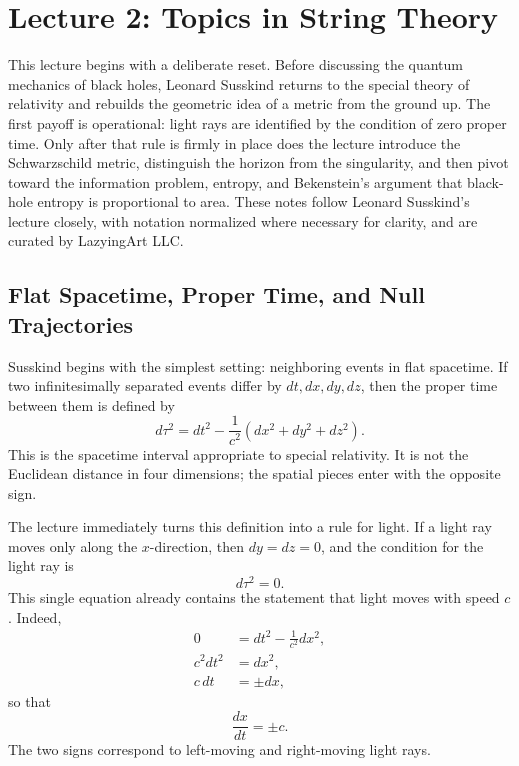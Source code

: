 \chapter{Lecture 2: Topics in String Theory}

This lecture begins with a deliberate reset. Before discussing the quantum mechanics of black holes, Leonard Susskind returns to the special theory of relativity and rebuilds the geometric idea of a metric from the ground up. The first payoff is operational: light rays are identified by the condition of zero proper time. Only after that rule is firmly in place does the lecture introduce the Schwarzschild metric, distinguish the horizon from the singularity, and then pivot toward the information problem, entropy, and Bekenstein's argument that black-hole entropy is proportional to area. These notes follow Leonard Susskind's lecture closely, with notation normalized where necessary for clarity, and are curated by LazyingArt LLC.

\section{Flat Spacetime, Proper Time, and Null Trajectories}

Susskind begins with the simplest setting: neighboring events in flat spacetime. If two infinitesimally separated events differ by \(dt,dx,dy,dz\), then the proper time between them is defined by
\begin{equation}
d\tau^2 = dt^2 - \frac{1}{c^2}\left(dx^2+dy^2+dz^2\right).
\end{equation}
This is the spacetime interval appropriate to special relativity. It is not the Euclidean distance in four dimensions; the spatial pieces enter with the opposite sign.

The lecture immediately turns this definition into a rule for light. If a light ray moves only along the \(x\)-direction, then \(dy=dz=0\), and the condition for the light ray is
\begin{equation}
d\tau^2=0.
\end{equation}
This single equation already contains the statement that light moves with speed \(c\). Indeed,
\begin{align}
0 &= dt^2 - \frac{1}{c^2}dx^2,\\
c^2dt^2 &= dx^2,\\
c\,dt &= \pm dx,
\end{align}
so that
\begin{equation}
\frac{dx}{dt}=\pm c.
\end{equation}
The two signs correspond to left-moving and right-moving light rays.

